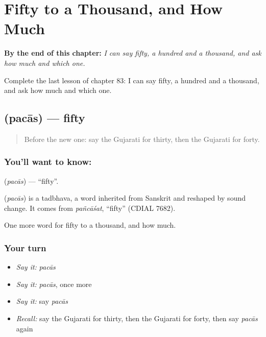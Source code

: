 
\chapter{Fifty to a Thousand, and How Much}
\label{ch:gu-fifty-to-a-thousand-and-how-much}

\begin{chapteropening}
\textbf{By the end of this chapter:} \emph{I can say fifty, a hundred and a thousand, and ask how much and which one.}

Complete the last lesson of chapter 83: I can say fifty, a hundred and a thousand, and ask how much and which one.
\end{chapteropening}

\section[\texorpdfstring{\gu{પચાસ} (pacās)}{પચાસ (pacās)}]{ (pacās) — fifty}

\label{lesson:GU-C83-fifty}



\begin{quote}
Before the new one: say the Gujarati for thirty, then the Gujarati for forty.
\end{quote}

\subsection*{You'll want to know: }
\textbf{} (\emph{pacās}) — \textquotedblleft{}fifty\textquotedblright{}.

\begin{cousinweb}
\textbf{} (\emph{pacās}) is a tadbhava, a word inherited from Sanskrit and reshaped by sound change. It comes from \emph{pañcāśat}, \textquotedblleft{}fifty\textquotedblright{} (CDIAL 7682).
\end{cousinweb}

\begin{grammarlens}[title={What you've built}]
One more word for fifty to a thousand, and how much.
\end{grammarlens}

\subsection*{Your turn}
\begin{itemize}
\raggedright
  \item \emph{Say it:} \emph{pacās}
  \item \emph{Say it:} \emph{pacās}, once more
  \item \emph{Say it:} say \emph{pacās}
  \item \emph{Recall:} say the Gujarati for thirty, then the Gujarati for forty, then say \emph{pacās} again
\end{itemize}

